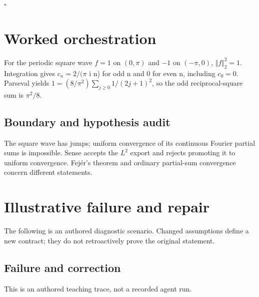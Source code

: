 \documentclass[preprint,12pt,aps,pra,showkeys,amsmath,amssymb,superscriptaddress,floatfix]{revtex4-2}
\theoremstyle{definition}
\theoremstyle{remark}
\begin{document}
\hfill$\square$

\section{Worked orchestration}

For the periodic square wave \(f=1\) on \((0,\pi )\) and \(-1\) on
\((-\pi ,0)\), \(\Vert f\Vert _{2}^{2}=1\). Integration gives
\(c_n=2/(\pi\) i n) for odd n and 0 for even n, including \(c_{0}=0\).
Parseval yields \(1=(8/\pi ^{2})\sum _{j\ge 0}1/(2j+1)^{2}\), so the odd
reciprocal-square sum is \(\pi ^{2}/8\).

\subsection{Boundary and hypothesis audit}

The square wave has jumps; uniform convergence of its continuous Fourier
partial sums is impossible. Sense accepts the \(L^{2}\) export and
rejects promoting it to uniform convergence. Fejér's theorem and
ordinary partial-sum convergence concern different statements.

\section{Illustrative failure and repair}

The following is an authored diagnostic scenario. Changed assumptions
define a new contract; they do not retroactively prove the original
statement.

\subsection{Failure and correction}
This is an authored teaching trace, not a recorded agent run.
\end{document}
